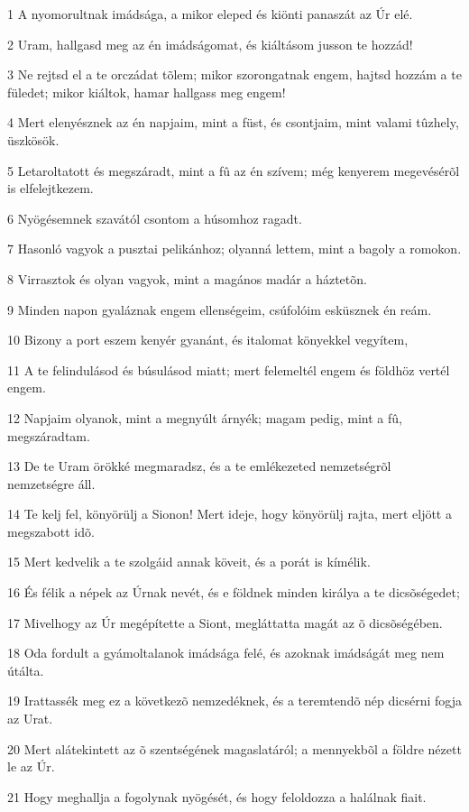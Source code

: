 \par 1 A nyomorultnak imádsága, a mikor eleped és kiönti panaszát az Úr elé.
\par 2 Uram, hallgasd meg az én imádságomat, és kiáltásom jusson te hozzád!
\par 3 Ne rejtsd el a te orczádat tõlem; mikor szorongatnak engem, hajtsd hozzám a te füledet; mikor kiáltok, hamar hallgass meg engem!
\par 4 Mert elenyésznek az én napjaim, mint a füst, és csontjaim, mint valami tûzhely, üszkösök.
\par 5 Letaroltatott és megszáradt, mint a fû az én szívem; még kenyerem megevésérõl is elfelejtkezem.
\par 6 Nyögésemnek szavától csontom a húsomhoz ragadt.
\par 7 Hasonló vagyok a pusztai pelikánhoz; olyanná lettem, mint a bagoly a romokon.
\par 8 Virrasztok és olyan vagyok, mint a magános madár a háztetõn.
\par 9 Minden napon gyaláznak engem ellenségeim, csúfolóim esküsznek én reám.
\par 10 Bizony a port eszem kenyér gyanánt, és italomat könyekkel vegyítem,
\par 11 A te felindulásod és búsulásod miatt; mert felemeltél engem és földhöz vertél engem.
\par 12 Napjaim olyanok, mint a megnyúlt árnyék; magam pedig, mint a fû, megszáradtam.
\par 13 De te Uram örökké megmaradsz, és a te emlékezeted nemzetségrõl nemzetségre áll.
\par 14 Te kelj fel, könyörülj a Sionon! Mert ideje, hogy könyörülj rajta, mert eljött a megszabott idõ.
\par 15 Mert kedvelik a te szolgáid annak köveit, és a porát is kímélik.
\par 16 És félik a népek az Úrnak nevét, és e földnek minden királya a te dicsõségedet;
\par 17 Mivelhogy az Úr megépítette a Siont, megláttatta magát az õ dicsõségében.
\par 18 Oda fordult a gyámoltalanok imádsága felé, és azoknak imádságát meg nem útálta.
\par 19 Irattassék meg ez a következõ nemzedéknek, és a teremtendõ nép dicsérni fogja az Urat.
\par 20 Mert alátekintett az õ szentségének magaslatáról; a mennyekbõl a földre nézett le az Úr.
\par 21 Hogy meghallja a fogolynak nyögését, és hogy feloldozza a halálnak fiait.
